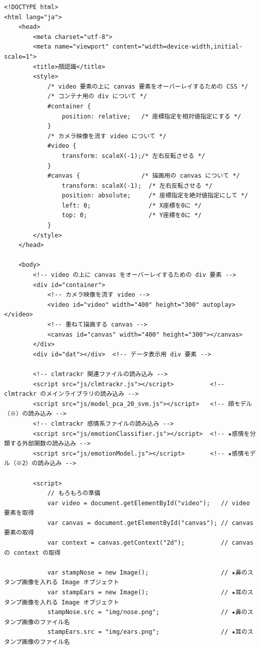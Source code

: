 \documentclass[mingoth,11pt,a4j,uplatex]{jsarticle}
\begin{document}
\begin{lstlisting}[caption=07-05.html]
<!DOCTYPE html>
<html lang="ja">
    <head>
        <meta charset="utf-8">
        <meta name="viewport" content="width=device-width,initial-scale=1">
        <title>顔認識</title>
        <style>
            /* video 要素の上に canvas 要素をオーバーレイするための CSS */
            /* コンテナ用の div について */
            #container {              
                position: relative;   /* 座標指定を相対値指定にする */
            }
            /* カメラ映像を流す video について */
            #video {                  
                transform: scaleX(-1);/* 左右反転させる */
            }
            #canvas {                 /* 描画用の canvas について */
                transform: scaleX(-1);  /* 左右反転させる */
                position: absolute;     /* 座標指定を絶対値指定にして */
                left: 0;                /* X座標を0に */
                top: 0;                 /* Y座標を0に */
            }
        </style>
    </head>

    <body>
        <!-- video の上に canvas をオーバーレイするための div 要素 -->
        <div id="container">  
            <!-- カメラ映像を流す video -->
            <video id="video" width="400" height="300" autoplay></video>
            <!-- 重ねて描画する canvas -->
            <canvas id="canvas" width="400" height="300"></canvas>        
        </div>
        <div id="dat"></div>  <!-- データ表示用 div 要素 -->
        
        <!-- clmtrackr 関連ファイルの読み込み -->
        <script src="js/clmtrackr.js"></script>          <!-- clmtrackr のメインライブラリの読み込み -->
        <script src="js/model_pca_20_svm.js"></script>   <!-- 顔モデル（※）の読み込み -->
        <!-- clmtrackr 感情系ファイルの読み込み -->
        <script src="js/emotionClassifier.js"></script>  <!-- ★感情を分類する外部関数の読み込み -->
        <script src="js/emotionModel.js"></script>       <!-- ★感情モデル（※2）の読み込み -->
        
        <script>
            // もろもろの準備
            var video = document.getElementById("video");   // video 要素を取得
            var canvas = document.getElementById("canvas"); // canvas 要素の取得
            var context = canvas.getContext("2d");          // canvas の context の取得
            
            var stampNose = new Image();                    // ★鼻のスタンプ画像を入れる Image オブジェクト
            var stampEars = new Image();                    // ★耳のスタンプ画像を入れる Image オブジェクト
            stampNose.src = "img/nose.png";                 // ★鼻のスタンプ画像のファイル名
            stampEars.src = "img/ears.png";                 // ★耳のスタンプ画像のファイル名
            

\end{lstlisting}
\end{document}
